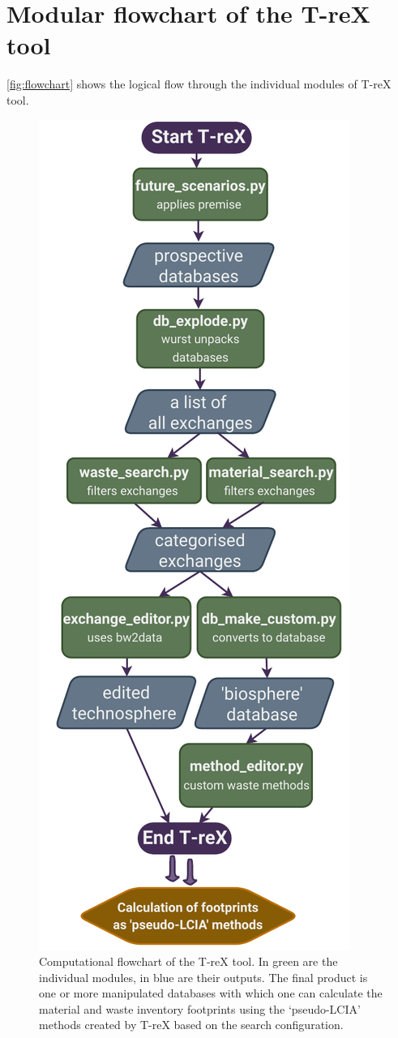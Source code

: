 \documentclass{article}
\begin{document}
\section{Modular flowchart of the T-reX tool}

\autoref{fig:flowchart} shows the logical flow through the individual modules of T-reX tool.

\begin{figure}[H]
    \centering
    \includegraphics[height=0.8\textheight]{figures/T-reX_flowchart.pdf}
    \caption{Computational flowchart of the T-reX tool. In green are the individual modules, in blue are their outputs. The final product is one or more manipulated databases with which one can calculate the material and waste inventory footprints using the `pseudo-LCIA' methods created by T-reX based on the search configuration.}\label{fig:flowchart}
\end{figure}
\end{document}
